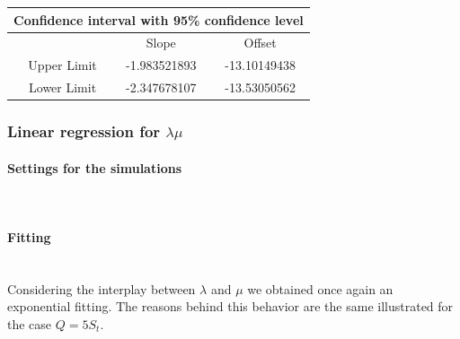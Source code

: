 \documentclass{article}
\begin{document}
                    \begin{table}[htbp]
                        \centering 
                        \begin{tabular}{|c|c|c|}
                            
                            \hline
                            \multicolumn{3}{|c|}{\bf Confidence interval with 95\% confidence level} \\
                            
                            \hline
                            \ & Slope & Offset\\
                            \hline
                            \ Upper Limit & -1.983521893 & -13.10149438 \\ 
                            \hline
                            \ Lower Limit & -2.347678107 & -13.53050562 \\ 
                            \hline
                        \end{tabular}
                        \label{table:CI_10_fitting_lambda}
                    \end{table}
                    
            \subsubsection{Linear regression for $\lambda\mu$}
                \paragraph{Settings for the simulations} \hfill \\
                    
                                \paragraph{Fitting} \hfill \\

                    Considering the interplay between $\lambda$ and $\mu$ we obtained once again an exponential fitting.
                    The reasons behind this behavior are the same illustrated for the case $Q = 5S_t$.
                    
\end{document}
